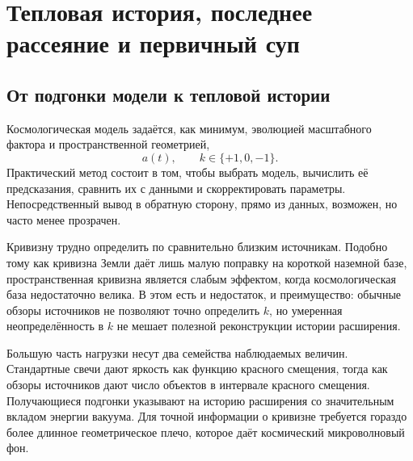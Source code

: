 \chapter{Тепловая история, последнее рассеяние и первичный суп}


\section{От подгонки модели к тепловой истории}

Космологическая модель задаётся, как минимум, эволюцией масштабного фактора и пространственной геометрией,
\begin{equation}
a(t),
\qquad
k\in\{+1,0,-1\}.
\end{equation}
Практический метод состоит в том, чтобы выбрать модель, вычислить её предсказания, сравнить их с данными и скорректировать параметры. Непосредственный вывод в обратную сторону, прямо из данных, возможен, но часто менее прозрачен.

Кривизну трудно определить по сравнительно близким источникам. Подобно тому как кривизна Земли даёт лишь малую поправку на короткой наземной базе, пространственная кривизна является слабым эффектом, когда космологическая база недостаточно велика. В этом есть и недостаток, и преимущество: обычные обзоры источников не позволяют точно определить \(k\), но умеренная неопределённость в \(k\) не мешает полезной реконструкции истории расширения.

Большую часть нагрузки несут два семейства наблюдаемых величин. Стандартные свечи дают яркость как функцию красного смещения, тогда как обзоры источников дают число объектов в интервале красного смещения. Получающиеся подгонки указывают на историю расширения со значительным вкладом энергии вакуума. Для точной информации о кривизне требуется гораздо более длинное геометрическое плечо, которое даёт космический микроволновый фон.

